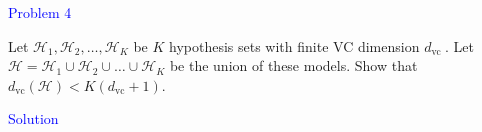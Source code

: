 \textcolor{blue}{Problem 4}

Let $\mathcal{H}_1, \mathcal{H}_2, \ldots, \mathcal{H}_K$ be $K$ hypothesis sets with finite VC dimension $d_{\text {vc }}$. Let $\mathcal{H}=\mathcal{H}_1 \cup \mathcal{H}_2 \cup \ldots \cup \mathcal{H}_K$ be the union of these models. Show that $d_{\mathrm{vc}}(\mathcal{H})<K\left(d_{\mathrm{vc}}+1\right)$.

\textcolor{blue}{Solution}\\













\newpage